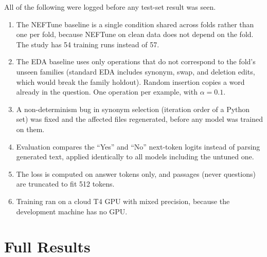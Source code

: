 \documentclass[11pt]{article}
\begin{document}
All of the following were logged before any test-set result was seen.

\begin{enumerate}
  \item[D1] The NEFTune baseline is a single condition shared across folds rather than one per fold, because NEFTune on clean data does not depend on the fold. The study has 54 training runs instead of 57.
  \item[D2] The EDA baseline uses only operations that do not correspond to the fold's unseen families (standard EDA includes synonym, swap, and deletion edits, which would break the family holdout). Random insertion copies a word already in the question. One operation per example, with $\alpha{=}0.1$.
  \item[D3] A non-determinism bug in synonym selection (iteration order of a Python set) was fixed and the affected files regenerated, before any model was trained on them.
  \item[D4] Evaluation compares the ``Yes'' and ``No'' next-token logits instead of parsing generated text, applied identically to all models including the untuned one.
  \item[D5] The loss is computed on answer tokens only, and passages (never questions) are truncated to fit 512 tokens.
  \item[D6] Training ran on a cloud T4 GPU with mixed precision, because the development machine has no GPU.
\end{enumerate}

\section{Full Results}
\label{app:full}
\end{document}
